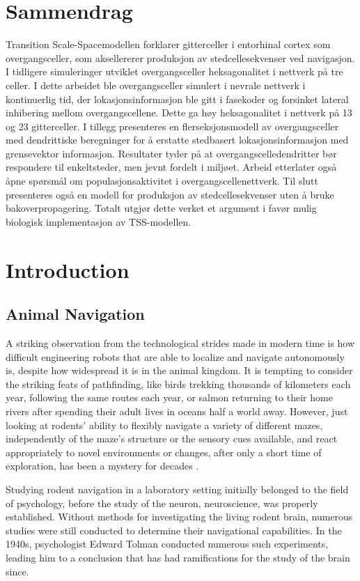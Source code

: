\documentclass{article}
\begin{document}
    \newpage
    \section*{Sammendrag}
    Transition Scale-Spacemodellen forklarer gitterceller i entorhinal cortex som overgangsceller, som aksellererer produksjon av stedcellesekvenser ved navigasjon. I tidligere simuleringer utviklet overgangsceller heksagonalitet i nettverk på tre celler. I dette arbeidet ble overgangsceller simulert i nevrale nettverk i kontinuerlig tid, der lokasjonsinformasjon ble gitt i fasekoder og forsinket lateral inhibering mellom overgangscellene. Dette ga høy heksagonalitet i nettverk på 13 og 23 gitterceller. I tillegg presenteres en flerseksjonsmodell av overgangsceller med dendrittiske beregninger for å erstatte stedbasert lokasjonsinformasjon med grensevektor informasjon. Resultater tyder på at overgangscelledendritter bør respondere til enkeltsteder, men jevnt fordelt i miljøet. Arbeid etterlater også åpne spørsmål om populasjonsaktivitet i overgangscellenettverk. Til slutt presenteres også en modell for produksjon av stedcellesekvenser uten å bruke bakoverpropagering. Totalt utgjør dette verket et argument i favør mulig biologisk implementasjon av TSS-modellen.  


    \newpage
    \section{Introduction}
    \subsection{Animal Navigation} \label{Animal Navigation}
    A striking observation from the technological strides made in modern time is how difficult engineering robots that are able to localize and navigate autonomously is, despite how widespread it is in the animal kingdom. It is tempting to consider the striking feats of pathfinding, like birds trekking thousands of kilometers each year, following the same routes each year, or salmon returning to their home rivers after spending their adult lives in oceans half a world away. However, just looking at rodents' ability to flexibly navigate a variety of different mazes, independently of the maze's structure or the sensory cues available, and react appropriately to novel environments or changes, after only a short time of exploration, has been a mystery for decades \parencite{Wynn2023}.

    Studying rodent navigation in a laboratory setting initially belonged to the field of psychology, before the study of the neuron, neuroscience, was properly established. Without methods for investigating the living rodent brain, numerous studies were still conducted to determine their navigational capabilities. In the 1940s, psychologist Edward Tolman conducted numerous such experiments, leading him to a conclusion that has had ramifications for the study of the brain since. 
    
\end{document}
